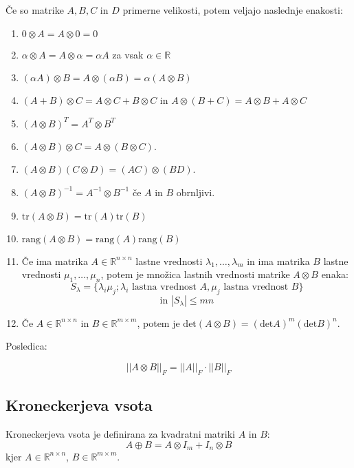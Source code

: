 \documentclass{article}
\begin{document}
\begin{multicols}{2}
Če so matrike $A, B, C$ in $D$ primerne velikosti, potem veljajo naslednje enakosti:
\begin{enumerate}
\item $0 \otimes A = A \otimes 0 = 0$
\item $\alpha \otimes A = A \otimes \alpha = \alpha A$ za vsak $\alpha \in \mathbb{R}$
\item $(\alpha A) \otimes B = A \otimes (\alpha B) = \alpha (A \otimes B)$
\item $(A + B) \otimes C = A \otimes C + B \otimes C$ in $A \otimes (B + C) = A \otimes B + A \otimes C$
\item $(A \otimes B)^T = A^T \otimes B^T$
\item $(A \otimes B) \otimes C = A \otimes (B \otimes C)$.
\item $(A \otimes B)(C \otimes D) = (AC) \otimes (BD)$.
\item $(A \otimes B)^{-1} = A^{-1} \otimes B^{-1}$ če $A$ in $B$ obrnljivi.
\item $\text{tr}(A \otimes B) = \text{tr}(A) \text{tr}(B)$
\item $\text{rang}(A \otimes B) = \text{rang}(A) \text{rang}(B)$
\item Če ima matrika $A \in \mathbb{R}^{n \times n}$ lastne vrednosti $\lambda_1, \ldots, \lambda_m$ in ima matrika $B$ lastne vrednosti $\mu_1, \ldots, \mu_n$, potem je množica lastnih vrednosti matrike $A \otimes B$ enaka:
$$ S_\lambda  = \{ \lambda_i \mu_j; \lambda_i \text{ lastna vrednost } A, \mu_j \text{ lastna vrednost } B\} $$
$$\text{in } |S_\lambda| \leq mn$$
\item Če $A \in \mathbb{R}^{n \times n}$ in $B \in \mathbb{R}^{m \times m}$, potem je $\text{det}(A \otimes B) = (\text{det} A)^m(\text{det} B)^n.$
\end{enumerate}

Posledica:

\[
||A \otimes B||_F = ||A||_F \cdot ||B||_F
\]

\subsection{Kroneckerjeva vsota}

Kroneckerjeva vsota je definirana za kvadratni matriki \( A \) in \( B \):
\[ A \oplus B = A \otimes I_m + I_n \otimes B \]
kjer \( A \in \mathbb{R}^{n \times n} \), \( B \in \mathbb{R}^{m \times m} \).


\end{multicols}
\end{document}
